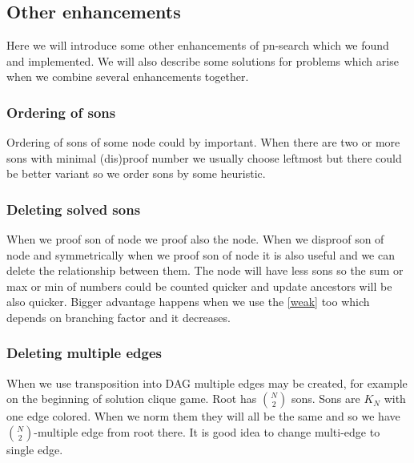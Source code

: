 \chapter{}


\section{Other enhancements}
Here we will introduce some other enhancements of pn-search which we found and
implemented. We will also describe some solutions for problems which arise 
when we combine several enhancements together. 

\subsection{Ordering of sons} \label{ord}

Ordering of sons of some node could by important. When there are two or more
sons with minimal (dis)proof number we usually choose leftmost but there could
be better variant so we order sons by some heuristic.

\subsection{Deleting solved sons}

When we proof son of  node we proof also the node. When we disproof
son of  node and symmetrically when we proof son of  node it
is also useful and we can delete the relationship between them. The node will
have less sons so the sum or max or min of numbers could be counted quicker and
update ancestors will be also quicker. Bigger advantage happens when we use the
 \ref{weak} too which depends on branching factor and it decreases.

\subsection{Deleting multiple edges }

When we use transposition into DAG multiple edges may be created, for example
on the beginning of solution clique game. Root has $N \choose 2$ sons. Sons are
$K_N$ with one edge colored. When we norm them they will all be the same and so
we have $N \choose 2$-multiple edge from root there. It is good idea to
change multi-edge to single edge.

